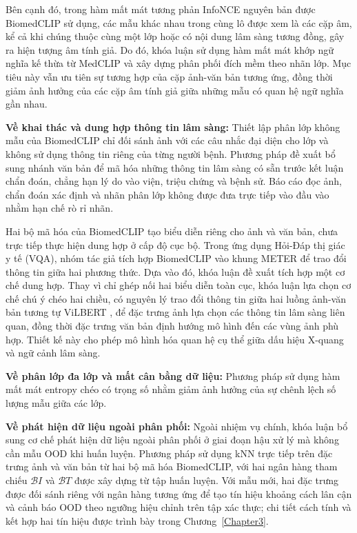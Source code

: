 Bên cạnh đó, trong hàm mất mát tương phản InfoNCE nguyên bản \cite{Oord2018CPC} được BiomedCLIP sử dụng, các mẫu khác nhau trong cùng lô được xem là các cặp âm, kể cả khi chúng thuộc cùng một lớp hoặc có nội dung lâm sàng tương đồng, gây ra hiện tượng âm tính giả. Do đó, khóa luận sử dụng hàm mất mát khớp ngữ nghĩa kế thừa từ MedCLIP \cite{MedCLIP} và xây dựng phân phối đích mềm theo nhãn lớp. Mục tiêu này vẫn ưu tiên sự tương hợp của cặp ảnh-văn bản tương ứng, đồng thời giảm ảnh hưởng của các cặp âm tính giả giữa những mẫu có quan hệ ngữ nghĩa gần nhau.

\pagebreak
\textbf{Về khai thác và dung hợp thông tin lâm sàng:}
Thiết lập phân lớp không mẫu của BiomedCLIP chỉ đối sánh ảnh với các câu nhắc đại diện cho lớp và không sử dụng thông tin riêng của từng người bệnh. Phương pháp đề xuất bổ sung nhánh văn bản để mã hóa những thông tin lâm sàng có sẵn trước kết luận chẩn đoán, chẳng hạn lý do vào viện, triệu chứng và bệnh sử. Báo cáo đọc ảnh, chẩn đoán xác định và nhãn phân lớp không được đưa trực tiếp vào đầu vào nhằm hạn chế rò rỉ nhãn.

Hai bộ mã hóa của BiomedCLIP tạo biểu diễn riêng cho ảnh và văn bản, chưa trực tiếp thực hiện dung hợp ở cấp độ cục bộ. Trong ứng dụng Hỏi-Đáp thị giác y tế (VQA), nhóm tác giả tích hợp BiomedCLIP vào khung METER để trao đổi thông tin giữa hai phương thức. Dựa vào đó, khóa luận đề xuất tích hợp một cơ chế dung hợp. Thay vì chỉ ghép nối hai biểu diễn toàn cục, khóa luận lựa chọn cơ chế chú ý chéo hai chiều, có nguyên lý trao đổi thông tin giữa hai luồng ảnh-văn bản tương tự ViLBERT \cite{Lu2019ViLBERT}, để đặc trưng ảnh lựa chọn các thông tin lâm sàng liên quan, đồng thời đặc trưng văn bản định hướng mô hình đến các vùng ảnh phù hợp. Thiết kế này cho phép mô hình hóa quan hệ cụ thể giữa dấu hiệu X-quang và ngữ cảnh lâm sàng.

\textbf{Về phân lớp đa lớp và mất cân bằng dữ liệu:}
Phương pháp sử dụng hàm mất mát entropy chéo có trọng số nhằm giảm ảnh hưởng của sự chênh lệch số lượng mẫu giữa các lớp.

\textbf{Về phát hiện dữ liệu ngoài phân phối:}
Ngoài nhiệm vụ chính, khóa luận bổ sung cơ chế phát hiện dữ liệu ngoài phân phối ở giai đoạn hậu xử lý mà không cần mẫu OOD khi huấn luyện. Phương pháp sử dụng kNN trực tiếp trên đặc trưng ảnh và văn bản từ hai bộ mã hóa BiomedCLIP, với hai ngân hàng tham chiếu $\mathcal{B}{I}$ và $\mathcal{B}{T}$ được xây dựng từ tập huấn luyện. Với mẫu mới, hai đặc trưng được đối sánh riêng với ngân hàng tương ứng để tạo tín hiệu khoảng cách lân cận và cảnh báo OOD theo ngưỡng hiệu chỉnh trên tập xác thực; chi tiết cách tính và kết hợp hai tín hiệu được trình bày trong Chương~\ref{Chapter3}.

